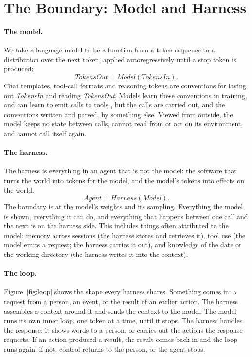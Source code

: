 \section{The Boundary: Model and Harness}
\label{sec:boundary}

\paragraph{The model.} We take a language model to be a function from a token sequence to a distribution over the next token, applied autoregressively until a stop token is produced:
\[
  \textit{TokensOut} = \textit{Model}(\textit{TokensIn}).
\]
Chat templates, tool-call formats and reasoning tokens are conventions for laying out \textit{TokensIn} and reading \textit{TokensOut}. Models learn these conventions in training, and can learn to emit calls to tools \citep{schick2023toolformer}, but the calls are carried out, and the conventions written and parsed, by something else. Viewed from outside, the model keeps no state between calls, cannot read from or act on its environment, and cannot call itself again.

\paragraph{The harness.} The harness is everything in an agent that is not the model: the software that turns the world into tokens for the model, and the model's tokens into effects on the world.
\[
  \textit{Agent} = \textit{Harness}(\textit{Model}).
\]
The boundary is at the model's weights and its sampling. Everything the model is shown, everything it can do, and everything that happens between one call and the next is on the harness side. This includes things often attributed to the model: memory across sessions (the harness stores and retrieves it), tool use (the model emits a request; the harness carries it out), and knowledge of the date or the working directory (the harness writes it into the context).

\paragraph{The loop.} Figure~\ref{fig:loop} shows the shape every harness shares. Something comes in: a request from a person, an event, or the result of an earlier action. The harness assembles a context around it and sends the context to the model. The model runs its own inner loop, one token at a time, until it stops. The harness handles the response: it shows words to a person, or carries out the actions the response requests. If an action produced a result, the result comes back in and the loop runs again; if not, control returns to the person, or the agent stops.

